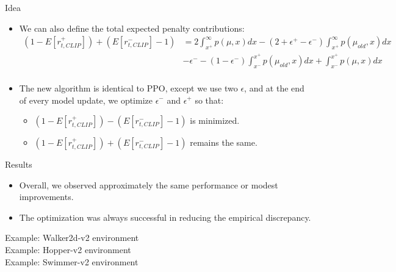 \documentclass{beamer}
\begin{document}
\begin{frame}{Idea}
\begin{itemize}
        \item We can also define the total expected penalty contributions:
        \tiny
        \begin{align*}
            (1 - E[r_{t, CLIP}^{+}]) + (E[r_{t, CLIP}^{-}] - 1)
            &=
            2\int_{x^{+}}^{\infty}
            p(\mu, x)
            dx -
            (2 + \epsilon^+ - \epsilon^-)
            \int_{x^{+}}^{\infty}p(\mu_{old}, x)dx\\
            &-
            \epsilon^-
            - 
            (1 - \epsilon^-)
            \int_{x^{-}}^{x^{+}}p(\mu_{old}, x)dx + 
            \int_{x^{-}}^{x^{+}}p(\mu, x)dx
            \\
        \end{align*}
        \normalsize
        \framebreak
        \item The new algorithm is identical to PPO, except we use two
            $\epsilon$, and at the end of every model update, we optimize
            $\epsilon^-$ and $\epsilon^+$ so that:
        \begin{itemize}
            \item $(1 - E[r_{t, CLIP}^{+}]) - (E[r_{t, CLIP}^{-}] - 1)$ is
                minimized.
            \item $(1 - E[r_{t, CLIP}^{+}]) + (E[r_{t, CLIP}^{-}] - 1)$ remains
                the same.
        \end{itemize}
    \end{itemize}
\end{frame}

\begin{frame}{Results}
    \begin{itemize}
        \item Overall, we observed approximately the same performance or modest
            improvements.
        \item The optimization was always successful in reducing the empirical
            discrepancy.
    \end{itemize}
    \framebreak
    Example: Walker2d-v2 environment
    \scalebox{0.6}{}\\
    Example: Hopper-v2 environment
    \scalebox{0.6}{}\\
    Example: Swimmer-v2 environment
    \scalebox{0.6}{}\\
\end{frame}
\end{document}
